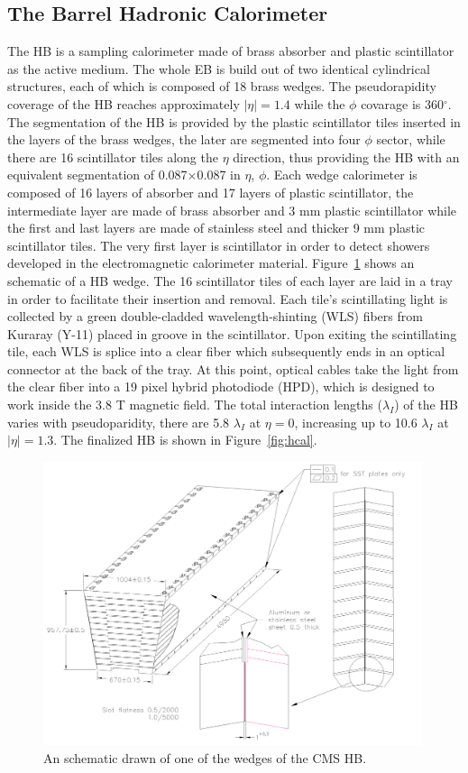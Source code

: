 \subsection{The Barrel Hadronic Calorimeter}
The HB is a sampling calorimeter made of brass absorber and plastic
scintillator as the active medium. The whole EB is build out of two
identical cylindrical structures, each of which is composed of 18
brass wedges. The pseudorapidity coverage of the HB reaches
approximately $|\eta| = 1.4$ while the $\phi$ covarage is
360$^{\circ}$. The segmentation of the HB is provided by the plastic
scintillator tiles inserted in the layers of the brass wedges, the later
are segmented into four $\phi$ sector, while there are 16 scintillator
tiles along the $\eta$ direction, thus providing the HB with an
equivalent segmentation of 0.087$\times$0.087 in $\eta$, $\phi$. Each
wedge calorimeter is composed of 16 layers of absorber and 17 layers of
plastic scintillator, the intermediate layer are made of brass
absorber and 3 mm plastic scintillator while the first and last layers
are made of stainless steel  and thicker 9 mm plastic scintillator
tiles. The very first layer is scintillator in order to detect showers
developed in the electromagnetic calorimeter
material. Figure~\ref{fig:HCALwedge} shows an schematic of a HB
wedge. The 16 scintillator tiles of each layer are laid in a tray in
order to facilitate their insertion and removal. Each tile's
scintillating light is collected by a green double-cladded
wavelength-shinting (WLS) fibers from Kuraray (Y-11) placed in groove
in the scintillator. Upon exiting the scintillating tile, each WLS is
splice into a clear fiber which subsequently ends in an optical
connector at the back of the tray. At this point, optical cables
take the light from the clear fiber into a 19 pixel hybrid photodiode
(HPD), which is designed to work inside the 3.8 T magnetic field. The
total interaction lengths ($\lambda_{I}$) of the HB varies with
pseudoparidity, there are 5.8 $\lambda_{I}$ at $\eta = 0$, increasing
up to 10.6 $\lambda_{I}$ at $|\eta| = 1.3$.
The finalized HB is shown in Figure~\ref{fig:hcal}.
\begin{figure}
 \centering
\includegraphics[width=0.99\textwidth]{CMS_DetectorFigures/HCAL_Wedge.pdf}
\caption{An schematic drawn of one of the wedges of the CMS HB.\label{fig:HCALwedge}}
\end{figure}
